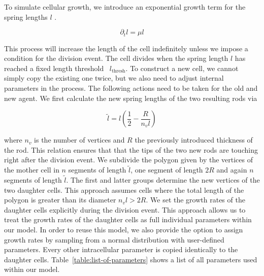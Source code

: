 \documentclass{article}
\begin{document}
To simulate cellular growth, we introduce an exponential growth term for the spring lengths $l$
\cite{Takeuchi2005}.

\begin{equation}
    \partial_t l = \mu l
\end{equation}

This process will increase the length of the cell indefinitely unless we impose a condition for the
division event.
The cell divides when the spring length $l$ has reached a fixed length threshold~\cite{Robert2014}
$l_\text{thresh}$.
To construct a new cell, we cannot simply copy the existing one twice, but we also need to adjust
internal parameters in the process.
The following actions need to be taken for the old and new agent.
We first calculate the new spring lengths of the two resulting rods via

\begin{equation}
    \tilde{l} = l\left(\frac{1}{2} - \frac{R}{n_v l}\right)
\end{equation}

where $n_v$ is the number of vertices and $R$ the previously introduced thickness of the rod.
This relation ensures that that the tips of the two new rods are touching right after the division
event.
We subdivide the polygon given by the vertices of the mother cell in $n$ segments of length
$\tilde{l}$, one segment of length $2R$ and again $n$ segments of length $\tilde{l}$.
The first and latter groups determine the new vertices of the two daughter cells.
This approach assumes cells where the total length of the polygon is greater than its diameter
$n_vl>2R$.
We set the growth rates of the daughter cells explicitly during the division event.
This approach allows us to treat the growth rates of the daughter cells as full individual
parameters within our model.
In order to reuse this model, we also provide the option to assign growth rates by sampling from a
normal distribution with user-defined parameters.
Every other intracellular parameter is copied identically to the daughter cells.
Table~\ref{table:list-of-parameters} shows a list of all parameters used within our model.
\end{document}
